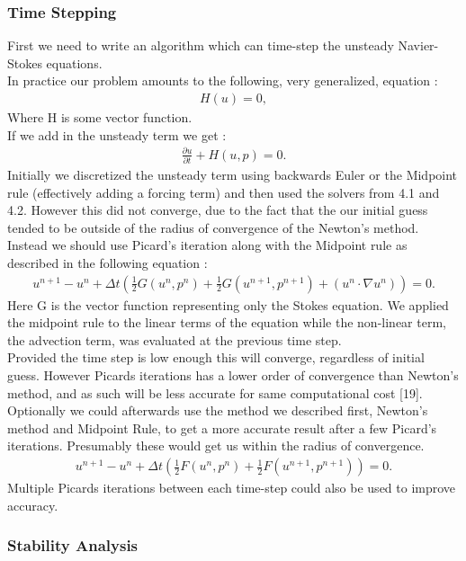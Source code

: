 \documentclass[11pt,twoside,a4paper]{article}
\begin{document}
\subsubsection{Time Stepping}
First we need to write an algorithm which can time-step the unsteady Navier-Stokes equations.\\
In practice our problem amounts to the following, very generalized, equation :
\begin{align*}
H(u) = 0 ,
\end{align*}
Where H is some vector function.\\
If we add in the unsteady term we get :
\begin{align}
\frac{\partial u}{\partial t} + H(u,p) = 0.
\end{align}
Initially we discretized the unsteady term using backwards Euler or the Midpoint rule (effectively adding a forcing term) and then used the solvers from 4.1 and 4.2. However this did not converge, due to the fact that the our initial guess tended to be outside of the radius of convergence of the Newton's method.\\
Instead we should use Picard's iteration along with the Midpoint rule as described in the following equation :
\begin{align}
u^{n+1} - u^n + \Delta t (\frac{1}{2}G(u^n,p^n) + \frac{1}{2} G(u^{n+1},p^{n+1}) + ( u^n \cdot \nabla u^n) ) = 0 .
\end{align}
Here G is the vector function representing only the Stokes equation. We applied the midpoint rule to the linear terms of the equation while the non-linear term, the advection term, was evaluated at the previous time step.\\
Provided the time step is low enough this will converge, regardless of initial guess. However Picards iterations has a lower order of convergence than Newton's method, and as such will be less accurate for same computational cost [19].\\
Optionally we could afterwards use the method we described first, Newton's method and Midpoint Rule, to get a more accurate result after a few Picard's iterations. Presumably these would get us within the radius of convergence.
\begin{align}
u^{n+1} - u^n + \Delta t (\frac{1}{2}F(u^n,p^n) + \frac{1}{2} F(u^{n+1},p^{n+1})) = 0 .
\end{align}
Multiple Picards iterations between each time-step could also be used to improve accuracy.

\subsubsection{Stability Analysis}
\end{document}
